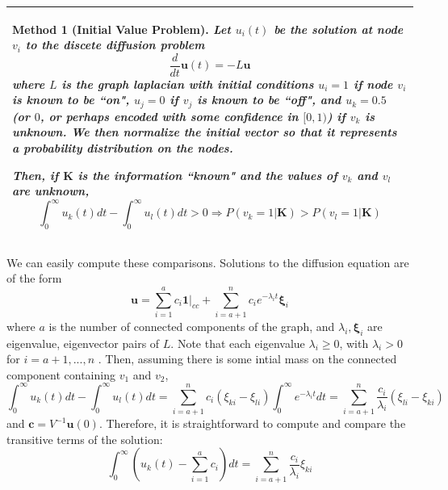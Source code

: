 \documentclass[10pt]{article}
\newtheorem{method}{Method}
\theoremstyle{definition}
\numberwithin{theorem}{section}
\numberwithin{definition}{section}
\numberwithin{lemma}{section}
\numberwithin{corollary}{section}
\numberwithin{clm}{section}
\numberwithin{rmk}{section}
\newenvironment{inbox2}
{\begin{center}
		\begin{tabular}{|p{0.9\textwidth}|}
			\hline \vspace{-0.5 cm}
		}
		{ 
			\\ \hline
		\end{tabular} 
	\end{center}
}
\renewcommand{\b}{\bm}
\begin{document}
\begin{inbox2}
\begin{method}[Initial Value Problem]\label{initalCond}
Let $u_i(t)$ be the solution at node $v_i$ to the discete diffusion problem
\[
\frac{d}{dt}\b{u}(t)  = - L\b{u}
\]
where $L$ is the  graph laplacian with initial conditions $u_i = 1$ if node $v_i$ is known to be ``on", $u_j = 0$ if $v_j$ is known to be ``off", and $u_k = 0.5$ (or $0$, or perhaps encoded with some confidence in $[0,1)$) if $v_k$ is unknown. We then normalize the initial vector so that it represents a probability distribution on the nodes.

Then, if $\b{K}$ is the information ``known" and the values of $v_{k}$ and $v_{l}$ are unknown,
\[
\int_0^{\infty} u_k(t) dt - \int_0^{\infty} u_l(t) dt >  0 \Rightarrow  P(v_k=  1|\b{K}) > P(v_l = 1|\b{K})
\]
\end{method}
\end{inbox2}
We can easily compute these comparisons. Solutions to the diffusion equation are of the form
\[
\b{u} = \sum_{i=1}^a c_i \b{1}|_{cc} + \sum_{i=a+1}^n c_i e^{-\lambda_i t} \b{\xi}_i 
\]
where $a$ is the number of connected components of the graph, and $\lambda_i,\b{\xi}_i$ are eigenvalue, eigenvector pairs of $L$. Note that each eigenvalue $\lambda_i \geq 0$, with $\lambda_i>0$ for $i = a+1,...,n$ \cite{vonLuxburg2007}. Then, assuming there is some intial mass on the connected component containing $v_1$ and $v_2$, 
\[
\int_0^{\infty} u_k(t) dt - \int_0^{\infty} u_l(t) dt =   \sum_{i=a+1}^n c_i  (\xi_{ki} - \xi_{li}) \int_0^{\infty} e^{-\lambda_i t} dt = \sum_{i=a+1}^n \frac{c_i}{\lambda_i}  (\xi_{li} - \xi_{ki}) 
\]
and $\b{c} = V^{-1}\b{u}(0)$. Therefore, it is straightforward to compute and compare the transitive terms of the solution:
\[
\int_0^{\infty}\left( u_k(t) - \sum_{i=1}^a c_i \right) dt = \sum_{i=a+1}^n \frac{c_i}{\lambda_i}\xi_{ki}
\]
\end{document}
